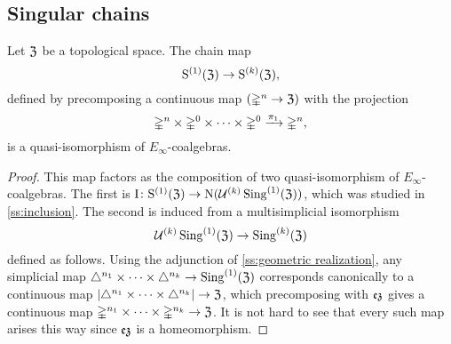 \subsection{Singular chains} \label{ss:singular}

\begin{theorem*}
	Let $\mathfrak{Z}$ be a topological space.
	The chain map
	\[
	\mathrm{S}^{(1)}(\mathfrak{Z}) \to \mathrm{S}^{(k)}(\mathfrak{Z}),
	\]
	defined by precomposing a continuous map $(\mathbb{\Delta}^n \to \mathfrak{Z})$ with the projection
	\[
	\mathbb{\Delta}^n \times \mathbb{\Delta}^{0}\times\dots\times\mathbb{\Delta}^{0} \xrightarrow{\pi_1} \mathbb{\Delta}^n,
	\]
	is a quasi-isomorphism of $E_\infty$-coalgebras.
\end{theorem*}

\begin{proof}
	This map factors as the composition of two quasi-isomorphism of $E_\infty$-coalgebras.
	The first is $\operatorname{I} \colon \mathrm{S}^{(1)}(\mathfrak{Z}) \to \operatorname{N}(\mathcal{U}^{(k)} \operatorname{Sing}^{(1)}(\mathfrak{Z}))$, which was studied in \cref{ss:inclusion}.
	The second is induced from a multisimplicial isomorphism
	\[
	\mathcal{U}^{(k)} \operatorname{Sing}^{(1)}(\mathfrak{Z}) \to \operatorname{Sing}^{(k)}(\mathfrak{Z})
	\]
	defined as follows.
	Using the adjunction of \cref{ss:geometric realization}, any simplicial map $\triangle^{n_1}\times\dots\times\triangle^{n_k} \to \operatorname{Sing}^{(1)}(\mathfrak{Z})$ corresponds canonically to a continuous map $\lvert\triangle^{n_1}\times\dots\times\triangle^{n_k}\rvert \to \mathfrak{Z}$, which precomposing with $\operatorname{\mathfrak{ez}}$ gives a continuous map $\mathbb{\Delta}^{n_1}\times\dots\times\mathbb{\Delta}^{n_k} \to \mathfrak{Z}$.
	It is not hard to see that every such map arises this way since $\operatorname{\mathfrak{ez}}$ is a homeomorphism.
\end{proof}